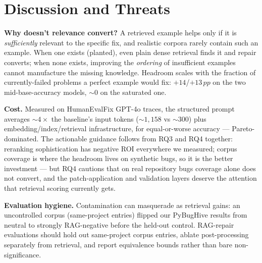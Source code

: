 \documentclass[10pt,conference,a4paper]{IEEEtran}
\newcommand{\pp}{\,pp}
\begin{document}
\section{Discussion and Threats}
\label{sec:discussion}

\textbf{Why doesn't relevance convert?} A retrieved example helps only if it
is \emph{sufficiently} relevant to the specific fix, and realistic corpora
rarely contain such an example. When one exists (planted), even plain dense
retrieval finds it and repair converts; when none exists, improving the
\emph{ordering} of insufficient examples cannot manufacture the missing
knowledge. Headroom scales with the fraction of currently-failed problems a
perfect example would fix: $+14$/$+13\pp$ on the two mid-base-accuracy
models, ${\sim}0$ on the saturated one.

\textbf{Cost.} Measured on HumanEvalFix GPT-4o traces, the structured
prompt averages ${\sim}4\times$ the baseline's input tokens
(${\sim}1{,}158$ vs ${\sim}300$) plus embedding/index/retrieval
infrastructure, for equal-or-worse accuracy --- Pareto-dominated. The
actionable guidance follows from RQ3 and RQ4 together: reranking
sophistication has negative ROI everywhere we measured; corpus coverage is
where the headroom lives on synthetic bugs, so it is the better investment
--- but RQ4 cautions that on real repository bugs coverage alone does not
convert, and the patch-application and validation layers deserve the
attention that retrieval scoring currently gets.

\textbf{Evaluation hygiene.} Contamination can masquerade as retrieval
gains: an uncontrolled corpus (same-project entries) flipped our PyBugHive
results from neutral to strongly RAG-negative before the held-out control.
RAG-repair evaluations should hold out same-project corpus entries, ablate
post-processing separately from retrieval, and report equivalence bounds
rather than bare non-significance.
\end{document}
